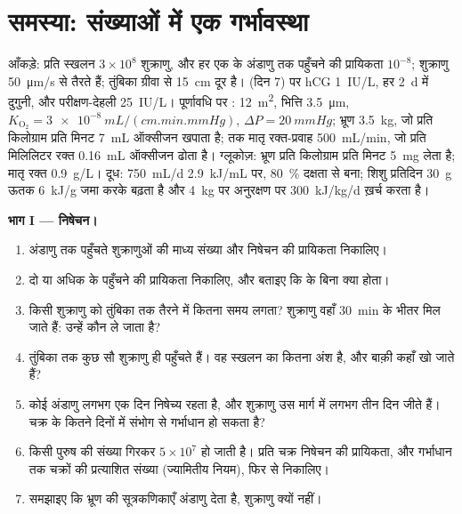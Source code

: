 \section{समस्या: संख्याओं में एक गर्भावस्था}

\begin{problem}
\label{pb:b2:mammal-reproduction:1}
आँकड़े: प्रति स्खलन $3\times 10^{8}$ शुक्राणु, और हर एक के अंडाणु तक
पहुँचने की प्रायिकता $10^{-8}$; शुक्राणु \qty{50}{\micro m/s} से तैरते
हैं; तुंबिका ग्रीवा से \qty{15}{cm} दूर है।  (दिन 7) पर hCG
\qty{1}{IU/L}, हर \qty{2}{d} में दुगुनी, और परीक्षण-देहली
\qty{25}{IU/L}। पूर्णावधि पर : \qty{12}{m^2}, भित्ति
\qty{3.5}{\micro m}, $K_{\mathrm{O_2}} = \qty{3e-8}{mL/(cm.min.mmHg)}$,
$\Delta P = \qty{20}{mmHg}$; भ्रूण \qty{3.5}{kg}, जो प्रति किलोग्राम
प्रति मिनट \qty{7}{mL} ऑक्सीजन खपाता है;  तक मातृ
रक्त-प्रवाह \qty{500}{mL/min}, जो प्रति मिलिलिटर रक्त \qty{0.16}{mL}
ऑक्सीजन ढोता है। ग्लूकोज़: भ्रूण प्रति किलोग्राम प्रति मिनट \qty{5}{mg}
लेता है; मातृ रक्त \qty{0.9}{g/L}। दूध: \qty{750}{mL/d}
\qty{2.9}{kJ/mL} पर, \qty{80}{\%} दक्षता से बना; शिशु प्रतिदिन
\qty{30}{g} ऊतक \qty{6}{kJ/g} जमा करके बढ़ता है और \qty{4}{kg} पर
अनुरक्षण पर \qty{300}{kJ/kg/d} ख़र्च करता है।

\medskip
\noindent\textbf{भाग I --- निषेचन।}
\begin{enumerate}
  \item अंडाणु तक पहुँचते शुक्राणुओं की माध्य संख्या और निषेचन की
        प्रायिकता निकालिए।
  \item दो या अधिक के पहुँचने की प्रायिकता निकालिए, और बताइए कि
         के बिना क्या होता।
  \item किसी शुक्राणु को तुंबिका तक तैरने में कितना समय लगता? शुक्राणु
        वहाँ \qty{30}{min} के भीतर मिल जाते हैं: उन्हें कौन ले जाता है?
  \item तुंबिका तक कुछ सौ शुक्राणु ही पहुँचते हैं। वह स्खलन का कितना
        अंश है, और बाक़ी कहाँ खो जाते हैं?
  \item कोई अंडाणु लगभग एक दिन निषेच्य रहता है, और शुक्राणु उस मार्ग
        में लगभग तीन दिन जीते हैं। चक्र के कितने दिनों में संभोग से
        गर्भाधान हो सकता है?
  \item किसी पुरुष की संख्या गिरकर $5\times 10^{7}$ हो जाती है। प्रति
        चक्र निषेचन की प्रायिकता, और गर्भाधान तक चक्रों की प्रत्याशित
        संख्या (ज्यामितीय नियम), फिर से निकालिए।
  \item समझाइए कि भ्रूण की सूत्रकणिकाएँ अंडाणु देता है, शुक्राणु क्यों
        नहीं।
\end{enumerate}


\end{problem}

